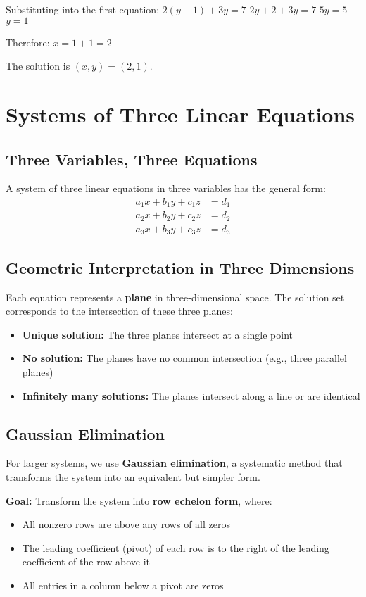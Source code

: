 \documentclass[12pt]{article}
\begin{document}
Substituting into the first equation:
$2(y + 1) + 3y = 7$
$2y + 2 + 3y = 7$
$5y = 5$
$y = 1$

Therefore: $x = 1 + 1 = 2$

The solution is $(x, y) = (2, 1)$.

\section{Systems of Three Linear Equations}

\subsection{Three Variables, Three Equations}

A system of three linear equations in three variables has the general form:
\begin{align}
a_1x + b_1y + c_1z &= d_1 \\
a_2x + b_2y + c_2z &= d_2 \\
a_3x + b_3y + c_3z &= d_3
\end{align}

\subsection{Geometric Interpretation in Three Dimensions}

Each equation represents a \textbf{plane} in three-dimensional space. The solution set corresponds to the intersection of these three planes:

\begin{itemize}
\item \textbf{Unique solution:} The three planes intersect at a single point
\item \textbf{No solution:} The planes have no common intersection (e.g., three parallel planes)
\item \textbf{Infinitely many solutions:} The planes intersect along a line or are identical
\end{itemize}

\subsection{Gaussian Elimination}

For larger systems, we use \textbf{Gaussian elimination}, a systematic method that transforms the system into an equivalent but simpler form.

\textbf{Goal:} Transform the system into \textbf{row echelon form}, where:
\begin{itemize}
\item All nonzero rows are above any rows of all zeros
\item The leading coefficient (pivot) of each row is to the right of the leading coefficient of the row above it
\item All entries in a column below a pivot are zeros
\end{itemize}
\end{document}
